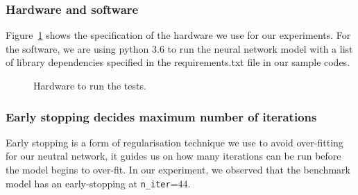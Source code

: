 \subsubsection{Hardware and software}
Figure~\ref{fig:hardware} shows the specification of the hardware we use for our experiments.
For the software, we are using python 3.6 to run the neural network model with a list of library dependencies specified in the requirements.txt file in our sample codes.

\begin{figure}
    \caption{Hardware to run the tests.}
    \label{fig:hardware}
\end{figure}


\subsubsection{Early stopping decides maximum number of iterations}
Early stopping is a form of regularisation technique we use to avoid over-fitting for our neutral network,
it guides us on how many iterations can be run before the model begins to over-fit.
In our experiment,
we observed that the benchmark model has an early-stopping at \texttt{n\_iter}=$44$.

